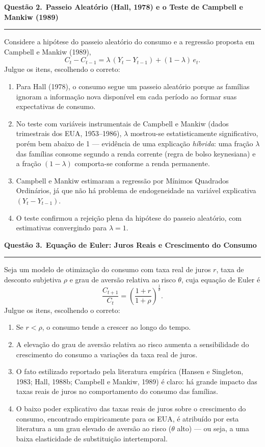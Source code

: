 \documentclass[12pt, a4paper]{article}
\newcommand{\provaquestao}[2]{%
  \par\vspace{0.9em}%
  {\large\bfseries\color{cyanrbc} Questão #1.}\ {\bfseries #2}\par
  \vspace{-0.45em}\rule{\linewidth}{0.4pt}\par\vspace{0.1em}}
\begin{document}
\provaquestao{2}{Passeio Aleatório (Hall, 1978) e o Teste de Campbell e Mankiw (1989)}

Considere a hipótese do passeio aleatório do consumo e a regressão proposta em
Campbell e Mankiw (1989),
\[
C_t - C_{t-1} = \lambda\,(Y_t - Y_{t-1}) + (1-\lambda)\,e_t.
\]
Julgue os itens, escolhendo o correto:

\begin{enumerate}[label=\alph*)]
\item Para Hall (1978), o consumo segue um passeio aleatório porque as famílias
ignoram a informação nova disponível em cada período ao formar suas
expectativas de consumo.
\item No teste com variáveis instrumentais de Campbell e Mankiw (dados
trimestrais dos EUA, 1953--1986), $\lambda$ mostrou-se estatisticamente
significativo, porém bem abaixo de 1 --- evidência de uma explicação
\emph{híbrida}: uma fração $\lambda$ das famílias consome segundo a renda
corrente (regra de bolso keynesiana) e a fração $(1-\lambda)$ comporta-se
conforme a renda permanente.
\item Campbell e Mankiw estimaram a regressão por Mínimos Quadrados Ordinários,
já que não há problema de endogeneidade na variável explicativa
$(Y_t - Y_{t-1})$.
\item O teste confirmou a rejeição plena da hipótese do passeio aleatório, com
estimativas convergindo para $\lambda = 1$.
\end{enumerate}

\provaquestao{3}{Equação de Euler: Juros Reais e Crescimento do Consumo}

Seja um modelo de otimização do consumo com taxa real de juros $r$, taxa de
desconto subjetiva $\rho$ e grau de aversão relativa ao risco $\theta$, cuja
equação de Euler é
\[
\frac{C_{t+1}}{C_t} = \left(\frac{1+r}{1+\rho}\right)^{\frac{1}{\theta}}.
\]
Julgue os itens, escolhendo o correto:

\begin{enumerate}[label=\alph*)]
\item Se $r < \rho$, o consumo tende a crescer ao longo do tempo.
\item A elevação do grau de aversão relativa ao risco aumenta a sensibilidade
do crescimento do consumo a variações da taxa real de juros.
\item O fato estilizado reportado pela literatura empírica (Hansen e Singleton,
1983; Hall, 1988b; Campbell e Mankiw, 1989) é claro: há grande impacto das
taxas reais de juros no comportamento do consumo das famílias.
\item O baixo poder explicativo das taxas reais de juros sobre o crescimento do
consumo, encontrado empiricamente para os EUA, é atribuído por esta literatura
a um grau elevado de aversão ao risco ($\theta$ alto) --- ou seja, a uma baixa
elasticidade de substituição intertemporal.
\end{enumerate}
\end{document}
